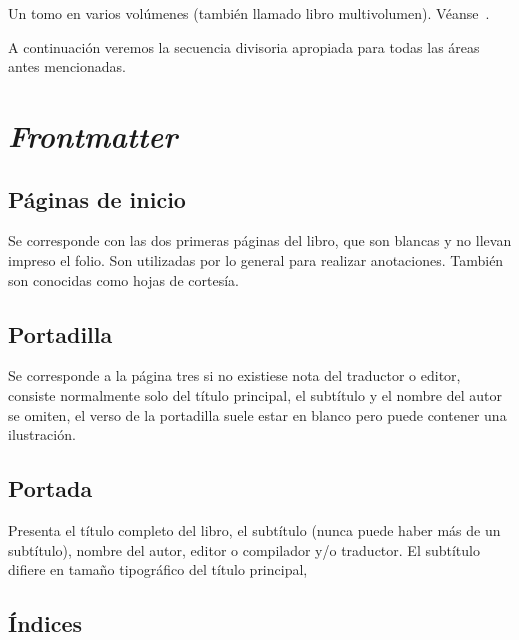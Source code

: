 \documentclass{book}
\begin{document}
{{{{{{{{{\begin{compactitem}
\item Un tomo en varios volúmenes (también llamado libro multivolumen). Véanse~\textcite{Marx2001,Marx2001a,Marx2001b}.
\end{compactitem}
\newpage
\begin{mdframed}[linewidth=.5pt,linecolor=black!30,roundcorner=3pt,backgroundcolor=yellow!15]
\noindent\vspace{-12pt}
\printbibliography[keyword=varios-volumenes,heading=none]
\end{mdframed}

A continuación veremos la secuencia divisoria apropiada para todas las áreas antes mencionadas.

\section{\emph{Frontmatter}}

\subsection{Páginas de inicio}

Se corresponde con las dos primeras páginas del libro, que son blancas y no llevan impreso el folio. Son utilizadas por lo general para realizar anotaciones. También son conocidas como hojas de cortesía.

\subsection{Portadilla}

Se corresponde a la página tres si no existiese nota del traductor o editor, consiste normalmente solo del título principal, el subtítulo y el nombre del autor se omiten, el verso de la portadilla suele estar en blanco pero puede contener una ilustración.

\subsection{Portada}

Presenta el título completo del libro, el subtítulo (nunca puede haber más de un subtítulo), nombre del autor, editor o compilador y/o traductor. El subtítulo difiere en tamaño tipográfico del título principal,

\subsection{Índices}

}}}}}}}}}
\end{document}
